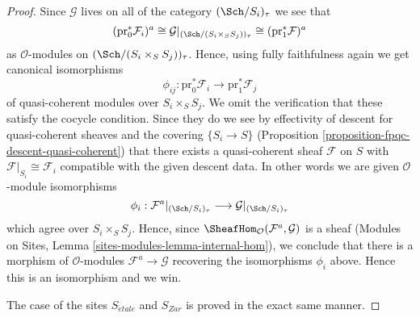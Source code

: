 \begin{proof}
\medskip\noindent
Since $\mathcal{G}$ lives on all of the category
$(\Sch/S_i)_\tau$ we see that
$$
(\text{pr}_0^*\mathcal{F}_i)^a
\cong
\mathcal{G}|_{(\Sch/(S_i \times_S S_j))_\tau}
\cong
(\text{pr}_1^*\mathcal{F})^a
$$
as $\mathcal{O}$-modules on $(\Sch/(S_i \times_S S_j))_\tau$.
Hence, using fully faithfulness again we get canonical isomorphisms
$$
\phi_{ij} :
\text{pr}_0^*\mathcal{F}_i
\longrightarrow
\text{pr}_1^*\mathcal{F}_j
$$
of quasi-coherent modules over $S_i \times_S S_j$. We omit the verification
that these satisfy the cocycle condition. Since they do we see by
effectivity of descent for quasi-coherent sheaves and the covering
$\{S_i \to S\}$ (Proposition \ref{proposition-fpqc-descent-quasi-coherent})
that there exists a quasi-coherent sheaf $\mathcal{F}$ on $S$
with $\mathcal{F}|_{S_i} \cong \mathcal{F}_i$ compatible
with the given descent data. In other words we are given
$\mathcal{O}$-module isomorphisms
$$
\phi_i :
\mathcal{F}^a|_{(\Sch/S_i)_\tau}
\longrightarrow
\mathcal{G}|_{(\Sch/S_i)_\tau}
$$
which agree over $S_i \times_S S_j$. Hence, since
$\SheafHom_\mathcal{O}(\mathcal{F}^a, \mathcal{G})$ is
a sheaf (Modules on Sites, Lemma \ref{sites-modules-lemma-internal-hom}),
we conclude that
there is a morphism of $\mathcal{O}$-modules $\mathcal{F}^a \to \mathcal{G}$
recovering the isomorphisms $\phi_i$ above. Hence this is an isomorphism
and we win.

\medskip\noindent
The case of the sites $S_{\acute{e}tale}$ and $S_{Zar}$ is proved in the
exact same manner.
\end{proof}


